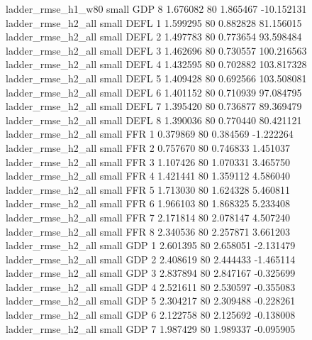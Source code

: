       ladder_rmse_h1_w80      small      GDP                 8 1.676082 80       1.865467         -10.152131
      ladder_rmse_h2_all      small     DEFL                 1 1.599295 80       0.882828          81.156015
      ladder_rmse_h2_all      small     DEFL                 2 1.497783 80       0.773654          93.598484
      ladder_rmse_h2_all      small     DEFL                 3 1.462696 80       0.730557         100.216563
      ladder_rmse_h2_all      small     DEFL                 4 1.432595 80       0.702882         103.817328
      ladder_rmse_h2_all      small     DEFL                 5 1.409428 80       0.692566         103.508081
      ladder_rmse_h2_all      small     DEFL                 6 1.401152 80       0.710939          97.084795
      ladder_rmse_h2_all      small     DEFL                 7 1.395420 80       0.736877          89.369479
      ladder_rmse_h2_all      small     DEFL                 8 1.390036 80       0.770440          80.421121
      ladder_rmse_h2_all      small      FFR                 1 0.379869 80       0.384569          -1.222264
      ladder_rmse_h2_all      small      FFR                 2 0.757670 80       0.746833           1.451037
      ladder_rmse_h2_all      small      FFR                 3 1.107426 80       1.070331           3.465750
      ladder_rmse_h2_all      small      FFR                 4 1.421441 80       1.359112           4.586040
      ladder_rmse_h2_all      small      FFR                 5 1.713030 80       1.624328           5.460811
      ladder_rmse_h2_all      small      FFR                 6 1.966103 80       1.868325           5.233408
      ladder_rmse_h2_all      small      FFR                 7 2.171814 80       2.078147           4.507240
      ladder_rmse_h2_all      small      FFR                 8 2.340536 80       2.257871           3.661203
      ladder_rmse_h2_all      small      GDP                 1 2.601395 80       2.658051          -2.131479
      ladder_rmse_h2_all      small      GDP                 2 2.408619 80       2.444433          -1.465114
      ladder_rmse_h2_all      small      GDP                 3 2.837894 80       2.847167          -0.325699
      ladder_rmse_h2_all      small      GDP                 4 2.521611 80       2.530597          -0.355083
      ladder_rmse_h2_all      small      GDP                 5 2.304217 80       2.309488          -0.228261
      ladder_rmse_h2_all      small      GDP                 6 2.122758 80       2.125692          -0.138008
      ladder_rmse_h2_all      small      GDP                 7 1.987429 80       1.989337          -0.095905
